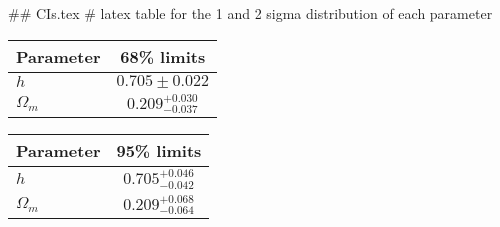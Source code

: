 ## CIs.tex
# latex table for the 1 and 2 sigma distribution of each parameter

\begin{tabular} { l  c}
 Parameter &  68\% limits\\
\hline
{\boldmath$h              $} & $0.705\pm 0.022            $\\
{\boldmath$\Omega_m       $} & $0.209^{+0.030}_{-0.037}   $\\
\hline
\end{tabular}

\begin{tabular} { l  c}
 Parameter &  95\% limits\\
\hline
{\boldmath$h              $} & $0.705^{+0.046}_{-0.042}   $\\
{\boldmath$\Omega_m       $} & $0.209^{+0.068}_{-0.064}   $\\
\hline
\end{tabular}
